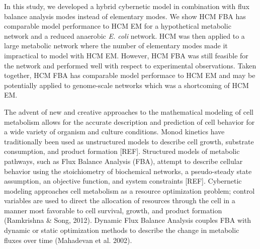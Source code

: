 \documentclass[10pt,twocolumn,twoside,final]{IEEEtran}
\begin{document}
In this study, we developed a hybrid cybernetic model in combination with flux balance analysis modes instead of elementary modes. 
We show HCM FBA has comparable model performance to HCM EM for a hypothetical metabolic network and a reduced anaerobic \textit{E. coli} network. 
HCM was then applied to a large metabolic network where the number of elementary modes made it impractical to model with HCM EM.  
However, HCM FBA was still feasible for the network and performed well with respect to experimental observations. 
Taken together, HCM FBA has comparable model performace to HCM EM and may be potentially applied to genome-scale networks which was a shortcoming of HCM EM.


The advent of new and creative approaches to the mathematical modeling of cell metabolism allows for the accurate description and prediction of cell behavior for a wide variety of organism and culture conditions.  Monod kinetics have traditionally been used as unstructured models to describe cell growth, substrate consumption, and product formation [REF].  Structured models of metabolic pathways, such as Flux Balance Analysis (FBA), attempt to describe cellular behavior using the stoichiometry of biochemical networks, a pseudo-steady state assumption, an objective function, and system constraints [REF].  Cybernetic modeling approaches cell metabolism as a resource optimization problem; control variables are used to direct the allocation of resources through the cell in a manner most favorable to cell survival, growth, and product formation (Ramkrishna \& Song, 2012). Dynamic Flux Balance Analysis couples FBA with dynamic or static optimization methods to describe the change in metabolic fluxes over time (Mahadevan et al. 2002).
\end{document}
